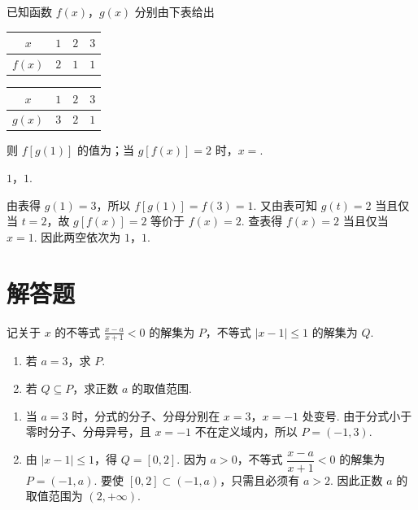 \begin{problem}
已知函数 \(f(x)\)，\(g(x)\) 分别由下表给出

\begin{center}
\begin{tabular}{|c|c|c|c|}
\hline
\(x\) & \(1\) & \(2\) & \(3\) \\
\hline
\(f(x)\) & \(2\) & \(1\) & \(1\) \\
\hline
\end{tabular}
\qquad
\begin{tabular}{|c|c|c|c|}
\hline
\(x\) & \(1\) & \(2\) & \(3\) \\
\hline
\(g(x)\) & \(3\) & \(2\) & \(1\) \\
\hline
\end{tabular}
\end{center}

则 \( f[g(1)] \) 的值为\fillinblank{}；当 \( g[f(x)] = 2 \) 时，\(x =\)\fillinblank{}.
\end{problem}

\begin{answer}
\(1\)，\(1\).
\end{answer}

\begin{solution}
由表得 \(g(1)=3\)，所以 \(f[g(1)]=f(3)=1\). 又由表可知 \(g(t)=2\) 当且仅当 \(t=2\)，故 \(g[f(x)]=2\) 等价于 \(f(x)=2\). 查表得 \(f(x)=2\) 当且仅当 \(x=1\). 因此两空依次为 \(1\)，\(1\).
\end{solution}

\section{解答题}
\begin{problem}
记关于 \(x\) 的不等式 \(\frac{x - a}{x + 1} < 0\) 的解集为 \(P\)，不等式 \(|x - 1| \leqslant 1\) 的解集为 \(Q\).

\begin{enumerate}
\item 若 \(a = 3\)，求 \(P\).
\item 若 \(Q \subseteq P\)，求正数 \(a\) 的取值范围.
\end{enumerate}
\end{problem}

\begin{solution}
\begin{enumerate}
\item 当 \(a=3\) 时，分式的分子、分母分别在 \(x=3\)，\(x=-1\) 处变号. 由于分式小于零时分子、分母异号，且 \(x=-1\) 不在定义域内，所以 \(P=\left(-1,3\right)\).
\item 由 \(|x-1|\leqslant1\)，得 \(Q=[0,2]\). 因为 \(a>0\)，不等式 \(\dfrac{x-a}{x+1}<0\) 的解集为 \(P=\left(-1,a\right)\). 要使 \([0,2]\subset\left(-1,a\right)\)，只需且必须有 \(a>2\). 因此正数 \(a\) 的取值范围为 \((2,+\infty)\).
\end{enumerate}
\end{solution}

